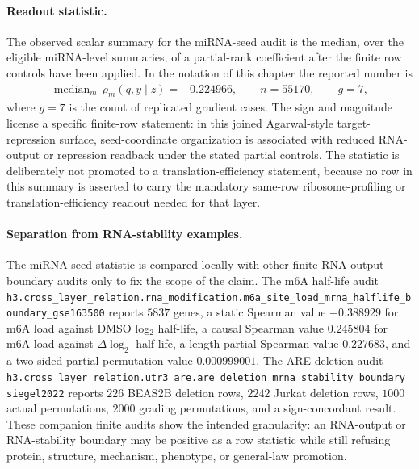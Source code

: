 \paragraph{Readout statistic.}
The observed scalar summary for the miRNA-seed audit is the median, over the eligible miRNA-level summaries, of a partial-rank coefficient after the finite row controls have been applied.  In the notation of this chapter the reported number is
$$
\begin{aligned}
  \operatorname{median}_{m}\,\rho_m(q,y\mid z)=-0.224966,
  \qquad n=55170,
  \qquad g=7,
\end{aligned}
$$
where $g=7$ is the count of replicated gradient cases.  The sign and magnitude license a specific finite-row statement: in this joined Agarwal-style target-repression surface, seed-coordinate organization is associated with reduced RNA-output or repression readback under the stated partial controls.  The statistic is deliberately not promoted to a translation-efficiency statement, because no row in this summary is asserted to carry the mandatory same-row ribosome-profiling or translation-efficiency readout needed for that layer.

\paragraph{Separation from RNA-stability examples.}
The miRNA-seed statistic is compared locally with other finite RNA-output boundary audits only to fix the scope of the claim.  The m6A half-life audit \texttt{h3.cross\_layer\_relation.rna\_modification.m6a\_site\_load\_mrna\_halflife\_boundary\_gse163500} reports $5837$ genes, a static Spearman value $-0.388929$ for m6A load against DMSO log$_2$ half-life, a causal Spearman value $0.245804$ for m6A load against $\Delta\log_2$ half-life, a length-partial Spearman value $0.227683$, and a two-sided partial-permutation value $0.000999001$.  The ARE deletion audit \texttt{h3.cross\_layer\_relation.utr3\_are.are\_deletion\_mrna\_stability\_boundary\_siegel2022} reports $226$ BEAS2B deletion rows, $2242$ Jurkat deletion rows, $1000$ actual permutations, $2000$ grading permutations, and a sign-concordant result.  These companion finite audits show the intended granularity: an RNA-output or RNA-stability boundary may be positive as a row statistic while still refusing protein, structure, mechanism, phenotype, or general-law promotion.

